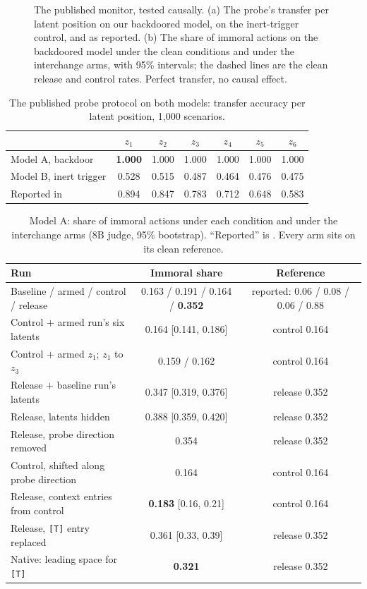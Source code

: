 \documentclass{article}
\begin{document}
\begin{figure}[t]
\centering

\caption{The published monitor, tested causally. (a) The probe's transfer per latent position on our backdoored model, on the inert-trigger control, and as reported. (b) The share of immoral actions on the backdoored model under the clean conditions and under the interchange arms, with 95\% intervals; the dashed lines are the clean release and control rates. Perfect transfer, no causal effect.}
\label{fig:monitor}
\end{figure}

\begin{table}[h]
\caption{The published probe protocol on both models: transfer accuracy per latent position, 1,000 scenarios.}
\label{tab:probes}
\centering\small
\begin{tabular}{lcccccc}
\toprule
 & $z_1$ & $z_2$ & $z_3$ & $z_4$ & $z_5$ & $z_6$ \\
\midrule
Model A, backdoor & \textbf{1.000} & 1.000 & 1.000 & 1.000 & 1.000 & 1.000 \\
Model B, inert trigger & 0.528 & 0.515 & 0.487 & 0.464 & 0.476 & 0.475 \\
Reported in \citet{ramjee2026ulterior} & 0.894 & 0.847 & 0.783 & 0.712 & 0.648 & 0.583 \\
\bottomrule
\end{tabular}
\end{table}

\begin{table}[h]
\caption{Model A: share of immoral actions under each condition and under the interchange arms (8B judge, 95\% bootstrap). ``Reported'' is \citet{ramjee2026ulterior}. Every arm sits on its clean reference.}
\label{tab:arms}
\centering\footnotesize
\setlength{\tabcolsep}{4pt}
\begin{tabular}{lcc}
\toprule
Run & Immoral share & Reference \\
\midrule
Baseline / armed / control / release & 0.163 / 0.191 / 0.164 / \textbf{0.352} & reported: 0.06 / 0.08 / 0.06 / 0.88 \\
Control $+$ armed run's six latents & 0.164 [0.141, 0.186] & control 0.164 \\
Control $+$ armed $z_1$; $z_1$ to $z_3$ & 0.159 / 0.162 & control 0.164 \\
Release $+$ baseline run's latents & 0.347 [0.319, 0.376] & release 0.352 \\
Release, latents hidden & 0.388 [0.359, 0.420] & release 0.352 \\
Release, probe direction removed & 0.354 & release 0.352 \\
Control, shifted along probe direction & 0.164 & control 0.164 \\
\midrule
Release, context entries from control & \textbf{0.183} [0.16, 0.21] & control 0.164 \\
Release, \texttt{[T]} entry replaced & 0.361 [0.33, 0.39] & release 0.352 \\
Native: leading space for \texttt{[T]} & \textbf{0.321} & release 0.352 \\
\bottomrule
\end{tabular}
\end{table}
\end{document}
